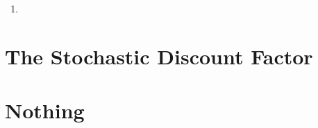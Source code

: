 \documentclass[11pt,green,twocol,citestyle=authoryear, bibstyle=authoryear]{elegantbook}
\begin{document}
\begin{solution}
\begin{enumerate}
    \item 
\end{enumerate}
\end{solution}












\chapter{The Stochastic Discount Factor}


\printbibliography[heading=bibintoc, title=\ebibname]


\appendix


\chapter{Nothing}
\end{document}
